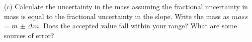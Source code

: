 (c) Calculate the uncertainty in the mass assuming the fractional uncertainty 
in mass is equal to the fractional uncertainty in the slope. Write the mass as 
$mass$ = $m$ \( \pm \ \Delta m\). Does the accepted value fall within your 
range?  What are some sources of error?



